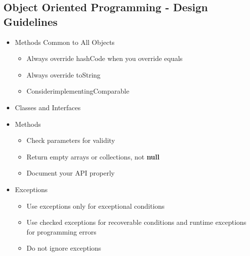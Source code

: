 \subsection*{Object Oriented Programming - Design Guidelines}
\begin{itemize}
	\item Methods Common to All Objects
	\begin{itemize}
		\item Always override hashCode when you override equals
		\item Always override toString
		\item ConsiderimplementingComparable
	\end{itemize}

	\item Classes and Interfaces
	\vspace{\the\itemsep}


	\item Methods
	\begin{itemize}
		\item Check parameters for validity
		\item Return empty arrays or collections, not \textbf{null}
		\item Document your API properly
	\end{itemize}

	\item Exceptions
	\begin{itemize}
		\item Use exceptions only for exceptional conditions
		\item Use checked exceptions for recoverable conditions and runtime exceptions for programming errors
		\item Do not ignore exceptions
	\end{itemize}


\end{itemize}
